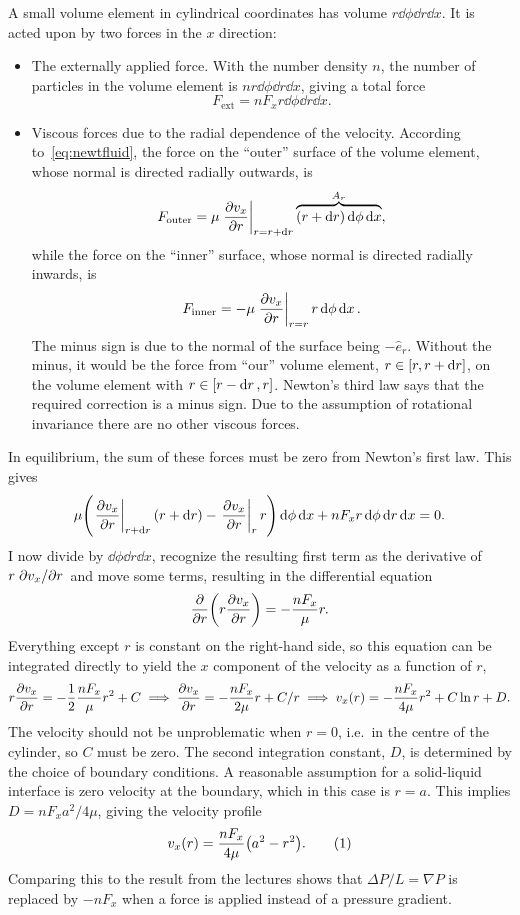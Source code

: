 \documentclass[11pt,british,a4paper]{report}
\newcommand{\eqtag}[1]{\refstepcounter{equation}\tag{\theequation}\label{#1}}
\begin{document}
A small volume element in cylindrical coordinates has volume \(r\dd{\phi}\dd{r}\dd{x}\). It is acted upon by two forces in the \(x\) direction:
\begin{itemize}
    \item The externally applied force. With the number density \(n\), the number of particles in the volume element is \(nr\dd{\phi}\dd{r}\dd{x}\), giving a total force
        \[
            F_{\text{ext}} = nF_xr\dd{\phi}\dd{r}\dd{x}.
        \]
    \item
        Viscous forces due to the radial dependence of the velocity. According to~\vref{eq:newtfluid}, the force on the ``outer'' surface of the volume element, whose normal is directed radially outwards, is
        \[
            F_{\text{outer}} = \mu \eval{\pdv{v_x}{r}}_{r=r+\dd{r}}\overbrace{\qty(r+\dd{r})\dd{\phi}\dd{x}}^{A_r},
        \]
        while the force on the ``inner'' surface, whose normal is directed radially inwards, is
        \[
            F_{\text{inner}} = -\mu \eval{\pdv{v_x}{r}}_{r=r}r\dd{\phi}\dd{x}.
        \]
        The minus sign is due to the normal of the surface being \(-\hat{e}_r\). Without the minus, it would be the force from ``our'' volume element, \(r\in\qty[r,r+\dd{r}]\), on the volume element with \(r\in\qty[r-\dd{r},r]\). Newton's third law says that the required correction is a minus sign. Due to the assumption of rotational invariance there are no other viscous forces.
\end{itemize}
In equilibrium, the sum of these forces must be zero from Newton's first law. This gives
\[
    \mu\qty(\eval{\pdv{v_x}{r}}_{r+\dd{r}}\qty(r+\dd{r})-\eval{\pdv{v_x}{r}}_{r}r)\dd{\phi}\dd{x} + nF_xr\dd{\phi}\dd{r}\dd{x} = 0.
\]
I now divide by \(\dd{\phi}\dd{r}\dd{x}\), recognize the resulting first term as the derivative of \(r\pdv*{v_x}{r}\) and move some terms, resulting in the differential equation
\[
    \pdv{r}(r\pdv{v_x}{r}) = -\frac{nF_x}{\mu}r.
\]
Everything except \(r\) is constant on the right-hand side, so this equation can be integrated directly to yield the \(x\) component of the velocity as a function of \(r\),
\[
    r\pdv{v_x}{r} = -\frac{1}{2}\frac{nF_x}{\mu}r^2 + C
    \implies \pdv{v_x}{r} = -\frac{nF_x}{2\mu}r + C/r
    \implies v_x(r) = -\frac{nF_x}{4\mu}r^2 + C\ln r + D.
\]
The velocity should not be unproblematic when \(r=0\), i.e.\ in the centre of the cylinder, so \(C\) must be zero. The second integration constant, \(D\), is determined by the choice of boundary conditions. A reasonable assumption for a solid-liquid interface is zero velocity at the boundary, which in this case is \(r=a\). This implies \(D=nF_xa^2/4\mu\), giving the velocity profile
\[
    v_x(r) = \frac{nF_x}{4\mu}\qty(a^2-r^2).\eqtag{eq:velprofile}
\]
Comparing this to the result from the lectures shows that \(\Delta P/L = \nabla P\) is replaced by \(-nF_x\) when a force is applied instead of a pressure gradient.
\end{document}
